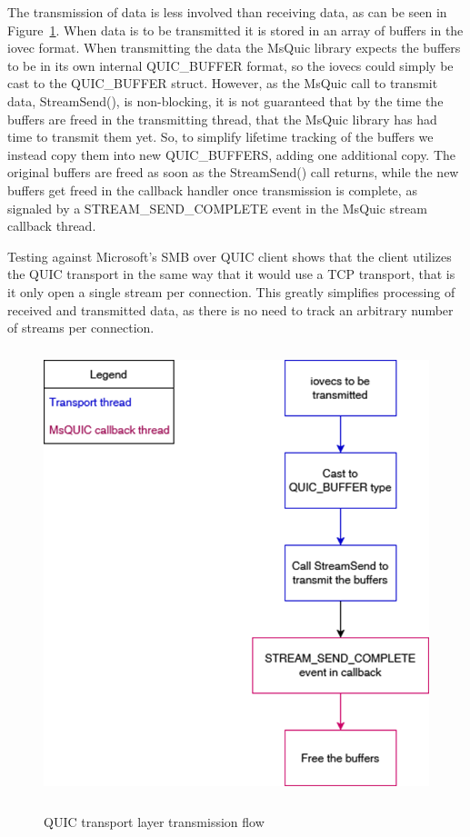 \documentclass[english, 12pt, a4paper, elec, utf8, a-2b, online]{aaltothesis}
\begin{document}
The transmission of data is less involved than receiving data, as can be seen
in Figure~\ref{fig:msquic_tx}. When data is to be transmitted it is stored in
an array of buffers in the iovec format. When transmitting the data the MsQuic
library expects the buffers to be in its own internal QUIC\_BUFFER format,
so the iovecs could simply be cast to the QUIC\_BUFFER struct. However, as the MsQuic call to transmit
data, StreamSend(), is non-blocking, it is not guaranteed that by the time the buffers
are freed in the transmitting thread, that the MsQuic library has had time to transmit them yet.
So, to simplify lifetime tracking of the buffers we instead copy them into new QUIC\_BUFFERS,
adding one additional copy.
The original buffers are freed as soon as the StreamSend() call returns, while the new
buffers get freed in the callback handler once transmission is complete, as signaled by a STREAM\_SEND\_COMPLETE
event in the MsQuic stream callback thread.

Testing against Microsoft's SMB over QUIC client shows that the client utilizes the
QUIC transport in the same way that it would use a TCP transport, that is it only
open a single stream per connection. This greatly simplifies processing of received
and transmitted data, as there is no need to track an arbitrary number of streams
per connection.

\begin{figure}[h]
	\centering
	\includegraphics[alt={Block diagram of the flow when sending data using the MsQuic library}, height=13cm]{./images/send_flow.png}
	\caption{QUIC transport layer transmission flow}
	\label{fig:msquic_tx}
\end{figure}
\end{document}

